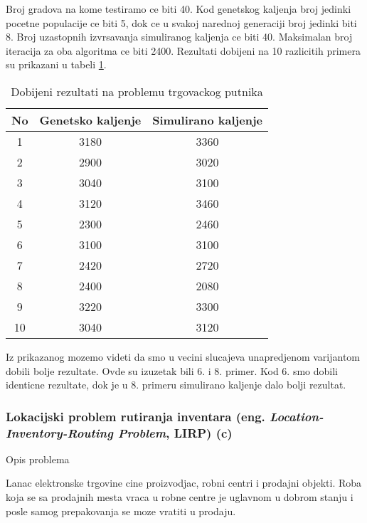 \documentclass[a4paper]{article}
\begin{document}
Broj gradova na kome testiramo ce biti 40. Kod genetskog kaljenja broj jedinki pocetne populacije ce biti 5, dok ce u svakoj narednoj generaciji broj jedinki biti 8. Broj uzastopnih izvrsavanja simuliranog kaljenja ce biti 40. Maksimalan broj iteracija za oba algoritma ce biti 2400. Rezultati dobijeni na 10 razlicitih primera su prikazani u tabeli \ref{tabela:1}. \\ 



\begin{table}[ht]
\begin{center}
\begin{tabular}{|c|c|c|} \hline
     No & Genetsko kaljenje & Simulirano kaljenje  \\ \hline
     1 &  3180 & 3360 \\ \hline
     2 &  2900 & 3020 \\ \hline
     3 &  3040 & 3100 \\ \hline
     4 &  3120 & 3460 \\ \hline
     5 &  2300 & 2460 \\ \hline
     6 &  3100 & 3100 \\ \hline
     7 &  2420 & 2720 \\ \hline
     8 &  2400 & 2080 \\ \hline
     9 &  3220 & 3300 \\ \hline
     10 & 3040 & 3120 \\ \hline
\end{tabular}
\end{center}
\label{tabela:1}
\caption{Dobijeni rezultati na problemu trgovackog putnika}
\end{table}
Iz prikazanog mozemo videti da smo u vecini slucajeva unapredjenom varijantom dobili bolje rezultate. Ovde su izuzetak bili 6. i 8. primer. Kod 6. smo dobili identicne rezultate, dok je u 8. primeru simulirano kaljenje dalo bolji rezultat.

\subsubsection{Lokacijski problem rutiranja inventara (eng. \textit{Location-Inventory-Routing Problem}, LIRP) (c)}
\newpage
\large{Opis problema} \\ \normalsize

Lanac elektronske trgovine cine proizvodjac, robni centri i prodajni objekti. Roba koja se sa prodajnih mesta vraca u robne centre je uglavnom u dobrom stanju i posle samog prepakovanja se moze vratiti u prodaju. 
\end{document}
